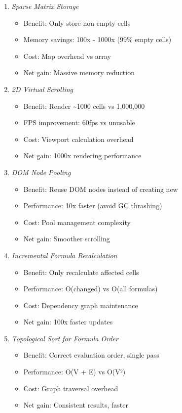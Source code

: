 \documentclass[11pt]{article}
\begin{document}
\begin{enumerate}
\item \emph{Sparse Matrix Storage}
\begin{itemize}
\item Benefit: Only store non-empty cells
\item Memory savings: 100x - 1000x (99\% empty cells)
\item Cost: Map overhead vs array
\item Net gain: Massive memory reduction
\end{itemize}

\item \emph{2D Virtual Scrolling}
\begin{itemize}
\item Benefit: Render \textasciitilde{}1000 cells vs 1,000,000
\item FPS improvement: 60fps vs unusable
\item Cost: Viewport calculation overhead
\item Net gain: 1000x rendering performance
\end{itemize}

\item \emph{DOM Node Pooling}
\begin{itemize}
\item Benefit: Reuse DOM nodes instead of creating new
\item Performance: 10x faster (avoid GC thrashing)
\item Cost: Pool management complexity
\item Net gain: Smoother scrolling
\end{itemize}

\item \emph{Incremental Formula Recalculation}
\begin{itemize}
\item Benefit: Only recalculate affected cells
\item Performance: O(changed) vs O(all formulas)
\item Cost: Dependency graph maintenance
\item Net gain: 100x faster updates
\end{itemize}

\item \emph{Topological Sort for Formula Order}
\begin{itemize}
\item Benefit: Correct evaluation order, single pass
\item Performance: O(V + E) vs O(V²)
\item Cost: Graph traversal overhead
\item Net gain: Consistent results, faster
\end{itemize}


\end{enumerate}
\end{document}
